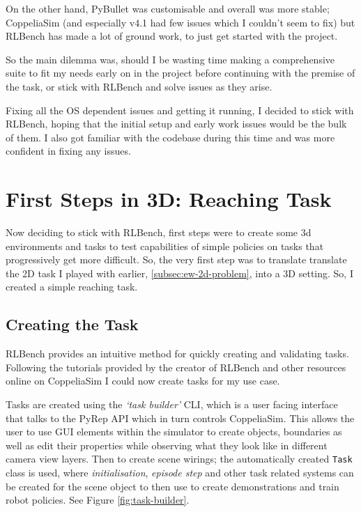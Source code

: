 On the other hand, PyBullet was customisable and overall was more stable; CoppeliaSim (and especially v4.1 had few issues which I couldn't seem to fix) but RLBench has made a lot of ground work, to just get started with the project.

So the main dilemma was, should I be wasting time making a comprehensive suite to fit my needs early on in the project before  continuing with the premise of the task, or stick with RLBench and solve issues as they arise.

Fixing all the OS dependent issues and getting it running, I decided to stick with RLBench, hoping that the initial setup and early work issues would be the bulk of them. I also got familiar with the codebase during this time and was more confident in fixing any issues.

\section{First Steps in 3D: Reaching Task}\label{sec:3d-reaching-tasks}
Now deciding to stick with RLBench, first steps were to create some 3d environments and tasks to test capabilities of simple policies on tasks that progressively get more difficult. So, the very first step was to translate translate the 2D task I played with earlier, \ref{subsec:ew-2d-problem}, into a 3D setting. So, I created a simple reaching task. 

\subsection{Creating the Task}
RLBench provides an intuitive method for quickly creating and validating tasks. Following the tutorials provided by the creator of RLBench and other resources online on CoppeliaSim  I could now create tasks for my use case.

Tasks are created using the \emph{`task builder'} CLI, which is a user facing interface that talks to the PyRep API which in turn controls CoppeliaSim. This allows the user to use GUI elements within the simulator to create objects, boundaries as well as edit their properties while observing what they look like in different camera view layers. Then to create scene wirings; the automatically created \verb|Task| class is used, where \emph{initialisation}, \emph{episode step} and other task related systems can be created for the scene object to then use to create demonstrations and train robot policies. See Figure \ref{fig:task-builder}.

